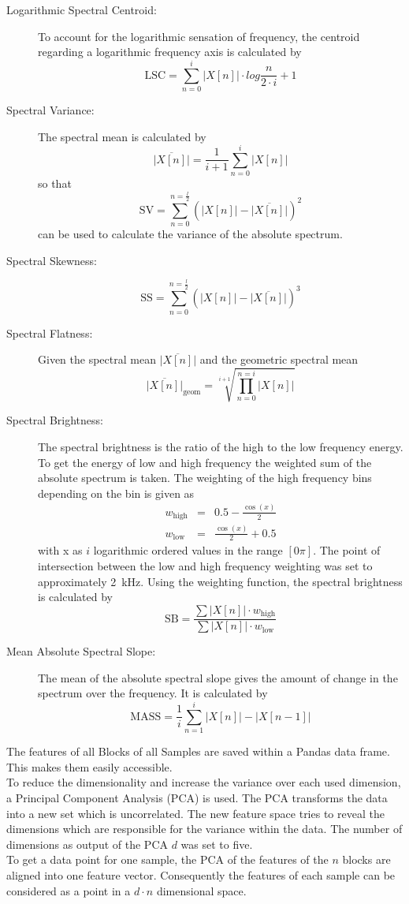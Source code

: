 \begin{description}
    \item[Logarithmic Spectral Centroid:]
        To account for the logarithmic sensation of frequency, the centroid regarding a logarithmic frequency axis is calculated by
        \[
            \mathrm{LSC} = \sum_{n=0}^{i}{|X[n]| \cdot log{\frac{n}{2 \cdot i}+1}}
        \]
    \item[Spectral Variance:]
        The spectral mean is calculated by 
        \[
            \overline{|X[n]|} = \frac{1}{i+1}\sum_{n=0}^{i}{|X[n]|}
        \]
        so that
        \[
            \mathrm{SV} = \sum_{n=0}^{n=\frac{l}{2}}{(|X[n]|-\overline{|X[n]|})^2}
        \]
        can be used to calculate the variance of the absolute spectrum.
    \item[Spectral Skewness:]
        \[
            \mathrm{SS} = \sum_{n=0}^{n=\frac{l}{2}}{(|X[n]|-\overline{|X[n]|})^3}
        \]
    \item[Spectral Flatness:]
        Given the spectral mean $\overline{|X[n]|}$ and the geometric spectral mean
        \[
            \overline{|X[n]|}_\mathrm{geom} = \sqrt[i+1]{\prod_{n=0}^{n=i}{|X[n]|}}
        \]
    \item[Spectral Brightness:]
        The spectral brightness is the ratio of the high to the low frequency energy. To get the energy of low and high frequency the weighted sum of the absolute spectrum is taken. The weighting of the high frequency bins depending on the bin is given as
        \begin{eqnarray*}
            w_\mathrm{high} &=& 0.5 - \frac{\cos(x)}{2}\\
            w_\mathrm{low} &=& \frac{\cos(x)}{2} + 0.5
        \end{eqnarray*}
        with x as $i$ logarithmic ordered values in the range $[0 \pi]$. The point of intersection between the low and high frequency weighting was set to approximately 2~kHz. Using the weighting function, the spectral brightness is calculated by
        \[
            \mathrm{SB} = \frac{\sum{|X[n]|\cdot w_\mathrm{high}}}{\sum{|X[n]|\cdot w_\mathrm{low} }}
        \]
    \item[Mean Absolute Spectral Slope:]
        The mean of the absolute spectral slope gives the amount of change in the spectrum over the frequency. It is calculated by
        \[
            \mathrm{MASS} = \frac{1}{i}\sum_{n=1}^{i}{|X[n]|-|X[n-1]|}
        \]
\end{description}
The features of all Blocks of all Samples are saved within a Pandas data frame. This makes them easily accessible.\\
To reduce the dimensionality and increase the variance over each used dimension, a Principal Component Analysis (PCA) is used. The PCA transforms the data into a new set which is uncorrelated. The new feature space tries to reveal the dimensions which are responsible for the variance within the data. The number of dimensions as output of the PCA $d$ was set to five.\\
To get a data point for one sample, the PCA of the features of the $n$ blocks are aligned into one feature vector. Consequently the features of each sample can be considered as a point in a $d \cdot n$ dimensional space.\\

